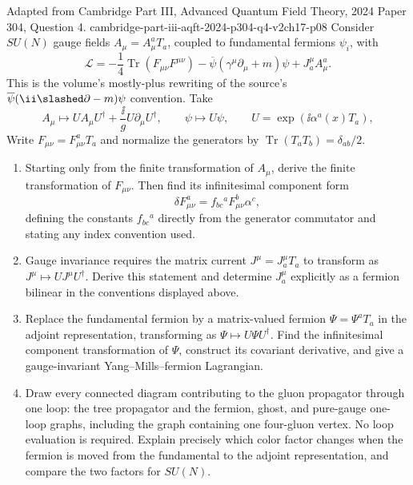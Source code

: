 \begin{enumerate}
  {Adapted from Cambridge Part III, Advanced Quantum Field Theory, 2024
  Paper 304, Question 4.}
  {cambridge-part-iii-aqft-2024-p304-q4-v2ch17-p08}
  Consider \(SU(N)\) gauge fields \(A_\mu=A_\mu^aT_a\), coupled to
  fundamental fermions \(\psi_i\), with
  \[
    \mathcal L=-\frac14\operatorname{Tr}(F_{\mu\nu}F^{\mu\nu})
      -\overline\psi(\gamma^\mu\partial_\mu+m)\psi
      +J_a^\mu A_\mu^a .
  \]
  This is the volume's mostly-plus rewriting of the source's
  \(\overline\psi(\ii\slashed\partial-m)\psi\) convention.  Take
  \[
    A_\mu\longmapsto UA_\mu U^\dagger
      +\frac{\ii}{g}U\partial_\mu U^\dagger,\qquad
    \psi\longmapsto U\psi,\qquad
    U=\exp(\ii\alpha^a(x)T_a),
  \]
  Write \(F_{\mu\nu}=F_{\mu\nu}^aT_a\) and normalize the generators by
  \(\operatorname{Tr}(T_aT_b)=\delta_{ab}/2\).
  \begin{enumerate}
    \item[(a)]
    Starting only from the finite transformation of \(A_\mu\), derive the
    finite transformation of \(F_{\mu\nu}\).  Then find its infinitesimal
    component form
    \[
      \delta F_{\mu\nu}^a=f_{bc}{}^aF_{\mu\nu}^b\alpha^c,
    \]
    defining the constants \(f_{bc}{}^a\) directly from the generator
    commutator and stating any index convention used.
    \item[(b)]
    Gauge invariance requires the matrix current \(J^\mu=J_a^\mu T_a\) to
    transform as \(J^\mu\mapsto UJ^\mu U^\dagger\).  Derive this statement
    and determine \(J_a^\mu\) explicitly as a fermion bilinear in the
    conventions displayed above.
    \item[(c)]
    Replace the fundamental fermion by a matrix-valued fermion
    \(\Psi=\Psi^aT_a\) in the adjoint representation, transforming as
    \(\Psi\mapsto U\Psi U^\dagger\).  Find the infinitesimal component
    transformation of \(\Psi\), construct its covariant derivative, and
    give a gauge-invariant Yang--Mills--fermion Lagrangian.
    \item[(d)]
    Draw every connected diagram contributing to the gluon propagator
    through one loop: the tree propagator and the fermion, ghost, and
    pure-gauge one-loop graphs, including the graph containing one
    four-gluon vertex.  No loop evaluation is required.  Explain precisely
    which color factor changes when the fermion is moved from the
    fundamental to the adjoint representation, and compare the two factors
    for \(SU(N)\).
  \end{enumerate}


\end{enumerate}
